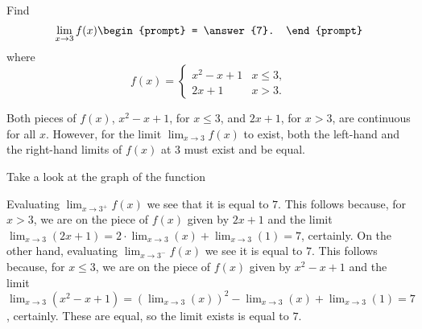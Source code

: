 \documentclass{ximera}
\author{Gregory Hartman \and Matthew Carr}
\begin{document}
\begin{exercise}



 Find 
  \[
  \lim_{x\to 3} f(x)
  \begin{prompt}
  = \answer{7}.
  \end{prompt}
  \]
  where
  \[
  f(x) = \begin{cases}x^2-x+1 & x\leq 3, \\
    2x+1 & x>3.
  \end{cases}
  \]
    \begin{hint}
     Both pieces of $f(x)$, $x^2-x+1$, for $x\leq3$, and $2x+1$, for $x>3$, are continuous for all $x$. However, for the limit $\lim_{x\to3}f(x)$ to exist, both the left-hand and the right-hand limits of $f(x)$ at $3$ must exist and be equal.
    \end{hint}
     \begin{hint}
    	Take a look at the graph of the function
    \begin{center}
      \end{center} 
    \end{hint}
    \begin{hint}
     Evaluating $\lim_{x\to3^{+}}f(x)$ we see that it is equal to $7$. This follows because, for $x>3$, we are on the piece of $f(x)$ given by $2x+1$ and the limit $\lim_{x\to3}\left({2x+1}\right)=2\cdot\lim_{x\to 3}(x)+\lim_{x\to3}\left({1}\right)=7$, certainly. On the other hand, evaluating $\lim_{x\to3^{-}}f(x)$ we see it is equal to $7$. This follows because, for $x\leq3$, we are on the piece of $f(x)$ given by $x^2-x+1$ and the limit $\lim_{x\to3}\left({x^2-x+1}\right)=\left({\lim_{x\to3}(x)}\right)^2-\lim_{x\to 3}(x)+\lim_{x\to3}\left({1}\right)=7$, certainly. These are equal, so the limit exists is equal to $7$.
    \end{hint}
\end{exercise}
\end{document}
